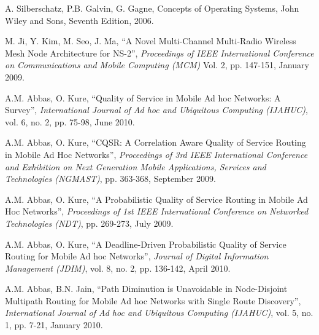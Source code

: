 \documentclass[10pt,times,epsfig,psfig,twocolumn,algorithm,algorithmic]{IEEEtran}
\begin{document}
\begin{thebibliography}{99}
 A. Silberschatz, P.B. Galvin, G. Gagne, Concepts of Operating Systems, John Wiley and Sons, Seventh Edition, 2006.

 M. Ji, Y. Kim, M. Seo, J. Ma, ``A Novel Multi-Channel Multi-Radio Wireless Mesh Node Architecture for NS-2'', {\it Proceedings of IEEE International Conference on Communications and Mobile Computing (MCM)} Vol. 2, pp. 147-151, January 2009.


 A.M. Abbas, O. Kure, ``Quality of Service in Mobile Ad hoc Networks: A Survey'', {\it International Journal of Ad hoc and Ubiquitous Computing (IJAHUC)}, vol. 6, no. 2, pp. 75-98, June 2010.

 A.M. Abbas, O. Kure, ``CQSR: A Correlation Aware Quality of Service Routing in Mobile Ad Hoc Networks'', {\em Proceedings of 3rd IEEE International Conference and Exhibition on Next Generation Mobile Applications, Services and Technologies (NGMAST)}, pp. 363-368, September 2009. 

 A.M. Abbas, O. Kure, ``A Probabilistic Quality of Service Routing in Mobile Ad Hoc Networks'', {\em Proceedings of 1st IEEE International Conference on Networked Technologies (NDT)}, pp. 269-273, July 2009.

 A.M. Abbas, O. Kure, ``A Deadline-Driven Probabilistic Quality of Service Routing for Mobile Ad hoc Networks'', {\em Journal of Digital Information Management (JDIM)}, vol. 8, no. 2, pp. 136-142, April 2010. 

 A.M. Abbas, B.N. Jain, ``Path Diminution is Unavoidable in Node-Disjoint Multipath Routing for Mobile Ad hoc Networks with Single Route Discovery'', {\it International Journal of Ad hoc and Ubiquitous Computing (IJAHUC)}, vol. 5, no. 1, pp. 7-21, January 2010.



\end{thebibliography}
\end{document}
